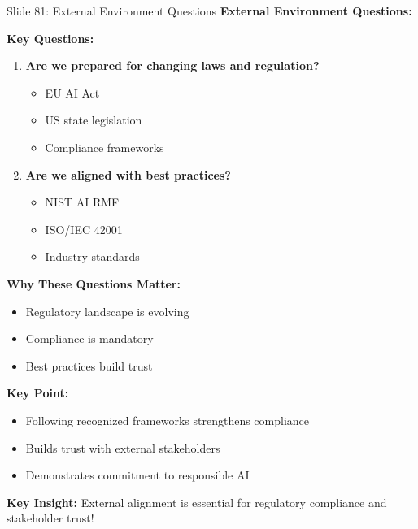 \documentclass[8pt]{beamer}
\begin{document}
	\begin{frame}{Slide 81: External Environment Questions}
		\fontsize{6.5}{7.5}\selectfont
		\textbf{External Environment Questions:}
		
		\vspace{0.1cm}
		\textbf{Key Questions:}
		\begin{enumerate}
			\item \textbf{Are we prepared for changing laws and regulation?}
			\begin{itemize}
				\item EU AI Act
				\item US state legislation
				\item Compliance frameworks
			\end{itemize}
			\item \textbf{Are we aligned with best practices?}
			\begin{itemize}
				\item NIST AI RMF
				\item ISO/IEC 42001
				\item Industry standards
			\end{itemize}
		\end{enumerate}
		
		\vspace{0.1cm}
		\textbf{Why These Questions Matter:}
		\begin{itemize}
			\item Regulatory landscape is evolving
			\item Compliance is mandatory
			\item Best practices build trust
		\end{itemize}
		
		\vspace{0.1cm}
		\textbf{Key Point:}
		\begin{itemize}
			\item Following recognized frameworks strengthens compliance
			\item Builds trust with external stakeholders
			\item Demonstrates commitment to responsible AI
		\end{itemize}
		
		\textcolor{myblue}{\textbf{Key Insight:}} External alignment is \textcolor{myblue}{essential for regulatory compliance and stakeholder trust}!
	\end{frame}
	
\end{document}
